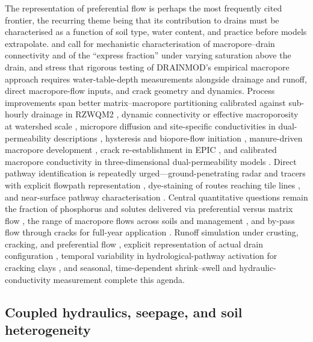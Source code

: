 \documentclass[11pt]{article}
\begin{document}
The representation of preferential flow is perhaps the most frequently cited
frontier, the recurring theme being that its contribution to drains must be
characterised as a function of soil type, water content, and practice before
models extrapolate. \textcite{Gaillot2023} and \textcite{Fox2004} call for
mechanistic characterisation of macropore--drain connectivity and of the
``express fraction'' under varying saturation above the drain, and
\textcite{Askar2020} stress that rigorous testing of DRAINMOD's empirical
macropore approach requires water-table-depth measurements alongside drainage
and runoff, direct macropore-flow inputs, and crack geometry and dynamics.
Process improvements span better matrix--macropore partitioning calibrated
against sub-hourly drainage in RZWQM2 \parencite{Li2023d}, dynamic connectivity
or effective macroporosity at watershed scale \parencite{Poon2021}, micropore
diffusion and site-specific conductivities in dual-permeability descriptions
\parencite{Villholth1998,Villholth1998b}, hysteresis and biopore-flow initiation
\parencite{Holbak2021}, manure-driven macropore development \parencite{Zhao2001},
crack re-establishment in EPIC \parencite{Wang2022}, and calibrated macropore
conductivity in three-dimensional dual-permeability models \parencite{Varvaris2018}.
Direct pathway identification is repeatedly urged---ground-penetrating radar and
tracers with explicit flowpath representation \parencite{Tähtikarhu2025,Salo2017},
dye-staining of routes reaching tile lines \parencite{Nielsen2015}, and
near-surface pathway characterisation \parencite{Frey2012,Allaire2011}. Central
quantitative questions remain the fraction of phosphorus and solutes delivered
via preferential versus matrix flow \parencite{King2015,Williams2016}, the range
of macropore flows across soils and management \parencite{Reid2012}, and by-pass
flow through cracks for full-year application
\parencite{LESAFFRE1988,BACKLUND1995,Ruark2009}. Runoff simulation under
crusting, cracking, and preferential flow \parencite{Smith2020}, explicit
representation of actual drain configuration \parencite{Stamm2002}, temporal
variability in hydrological-pathway activation for cracking clays
\parencite{Kokulan2019}, and seasonal, time-dependent shrink--swell and
hydraulic-conductivity measurement \parencite{Boivin2006,Chelil2022b,Jeantet2021}
complete this agenda.

\subsection{Coupled hydraulics, seepage, and soil heterogeneity}
\end{document}
